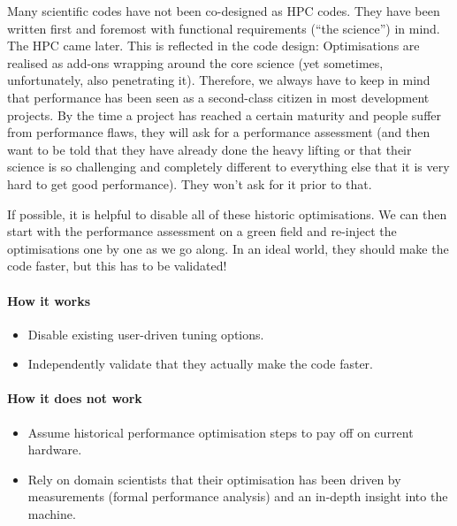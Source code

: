 \noindent
Many scientific codes have not been co-designed as HPC codes.
They have been written first and foremost with functional requirements (``the science'') in mind.
The HPC came later.
This is reflected in the code design:
Optimisations are realised as add-ons wrapping around the core science (yet sometimes, unfortunately, also penetrating it).
Therefore, we always have to keep in mind that performance has been seen as a second-class citizen in most development projects. 
By the time a project has reached a certain maturity and people suffer from performance flaws, they will ask for a performance assessment (and then want to be told that they have already done the heavy lifting or that their science is so challenging and completely different to everything else that it is very hard to get good performance).
They won't ask for it prior to that. 


If possible, it is helpful to disable all of these historic optimisations.
We can then start with the performance assessment on a green field and re-inject the optimisations one by one as we go along. 
In an ideal world, they should make the code faster, but this has to be validated!


\paragraph*{How it works}

\begin{itemize}[noitemsep]
  \item[$\boxplus$] Disable existing user-driven tuning options. 
  \item[$\boxplus$] Independently validate that they actually make the code faster. 
\end{itemize}


\paragraph*{How it does not work}

\begin{itemize}[noitemsep]
  \item[$\boxminus$] Assume historical performance optimisation steps to pay off on current hardware. 
  \item[$\boxminus$] Rely on domain scientists that their optimisation has been driven by measurements (formal performance analysis) and an in-depth insight into the machine. 
\end{itemize}

